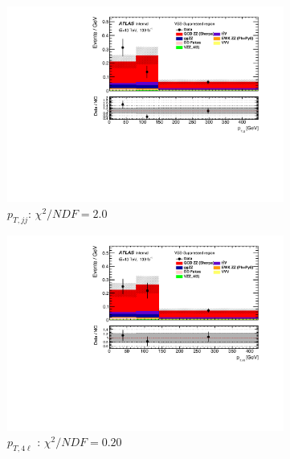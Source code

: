 \begin{figure}[!htb]
\begin{subfigure}{.49\textwidth}
        \includegraphics[width=.98\linewidth]{figures/Results/RecoDist_VBSSuppressed/reco_ptjj_CR.pdf}
        \caption{ \footnotesize{$p_{T,jj}$}: $\chi^2/NDF = 2.0$ }
    \end{subfigure}
    \begin{subfigure}{.49\textwidth}
        \centering
        \includegraphics[width=.98\linewidth]{figures/Results/RecoDist_VBSSuppressed/reco_pt4l_CR.pdf}
        \caption{ \footnotesize{$p_{T,4\ell}$ }: $\chi^2/NDF = 0.20$ }
    \end{subfigure}\\
    \begin{subfigure}{.49\textwidth}
        \centering

\end{subfigure}
\end{figure}
